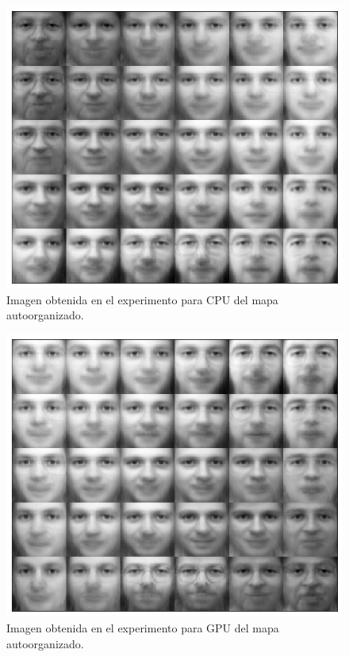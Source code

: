 \begin{figure}[ht]
\centering
\includegraphics[scale=0.3]{imagenes/facescpu.png}
\caption{Imagen obtenida en el experimento para CPU del mapa autoorganizado.}
\label{img:somcpu}
\end{figure}

\begin{figure}[ht]
\centering
\includegraphics[scale=0.3]{imagenes/facesgpu.png}
\caption{Imagen obtenida en el experimento para GPU del mapa autoorganizado.}
\label{img:somgpu}
\end{figure}

